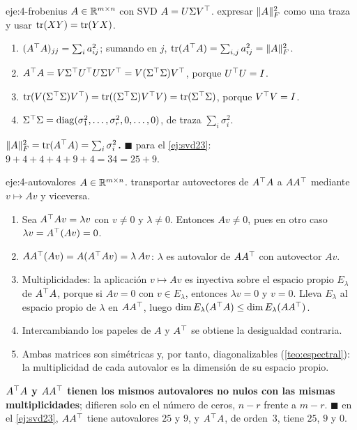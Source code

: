 \begin{solucion}{eje:4-frobenius}
\datos $A\in\mathbb{R}^{m\times n}$ con SVD $A=U\Sigma V^{\top}$.
\planteamiento expresar $\lVert A\rVert_F^{2}$ como una traza y usar $\operatorname{tr}(XY)=\operatorname{tr}(YX)$.
\pasos
\begin{enumerate}[label=\arabic*.]
  \item $(A^{\top} A)_{jj}=\sum_ia_{ij}^{2}$; sumando en $j$, $\operatorname{tr}(A^{\top} A)=\sum_{i,j}a_{ij}^{2}=\lVert A\rVert_F^{2}$.
  \item $A^{\top} A=V\Sigma^{\top} U^{\top} U\Sigma V^{\top}=V(\Sigma^{\top}\Sigma)V^{\top}$, porque $U^{\top} U=I$.
  \item $\operatorname{tr}(V(\Sigma^{\top}\Sigma)V^{\top})=\operatorname{tr}((\Sigma^{\top}\Sigma)V^{\top} V)=\operatorname{tr}(\Sigma^{\top}\Sigma)$, porque $V^{\top} V=I$.
  \item $\Sigma^{\top}\Sigma=\operatorname{diag}(\sigma_1^{2},\dots,\sigma_r^{2},0,\dots,0)$, de traza $\sum_i\sigma_i^{2}$.
\end{enumerate}
\resultado \textbf{$\lVert A\rVert_F^{2}=\operatorname{tr}(A^{\top} A)=\sum_i\sigma_i^{2}$.} \hfill$\blacksquare$
\comprobacion para el \cref{ej:svd23}: $9+4+4+4+9+4=34=25+9$.
\end{solucion}

\begin{solucion}{eje:4-autovalores}
\datos $A\in\mathbb{R}^{m\times n}$.
\planteamiento transportar autovectores de $A^{\top} A$ a $AA^{\top}$ mediante $v\mapsto Av$ y viceversa.
\pasos
\begin{enumerate}[label=\arabic*.]
  \item Sea $A^{\top} Av=\lambda v$ con $v\ne 0$ y $\lambda\ne 0$. Entonces $Av\ne 0$, pues en otro caso $\lambda v=A^{\top}(Av)=0$.
  \item $AA^{\top}(Av)=A(A^{\top} Av)=\lambda\,Av$: $\lambda$ es autovalor de $AA^{\top}$ con autovector $Av$.
  \item Multiplicidades: la aplicación $v\mapsto Av$ es inyectiva sobre el espacio propio $E_\lambda$ de $A^{\top} A$, porque si $Av=0$ con $v\in E_\lambda$, entonces $\lambda v=0$ y $v=0$. Lleva $E_\lambda$ al espacio propio de $\lambda$ en $AA^{\top}$, luego $\dim E_\lambda(A^{\top} A)\le\dim E_\lambda(AA^{\top})$.
  \item Intercambiando los papeles de $A$ y $A^{\top}$ se obtiene la desigualdad contraria.
  \item Ambas matrices son simétricas y, por tanto, diagonalizables (\cref{teo:espectral}): la multiplicidad de cada autovalor es la dimensión de su espacio propio.
\end{enumerate}
\resultado \textbf{$A^{\top} A$ y $AA^{\top}$ tienen los mismos autovalores no nulos con las mismas multiplicidades}; difieren solo en el número de ceros, $n-r$ frente a $m-r$. \hfill$\blacksquare$
\comprobacion en el \cref{ej:svd23}, $AA^{\top}$ tiene autovalores $25$ y $9$, y $A^{\top} A$, de orden~3, tiene $25$, $9$ y $0$.
\end{solucion}

